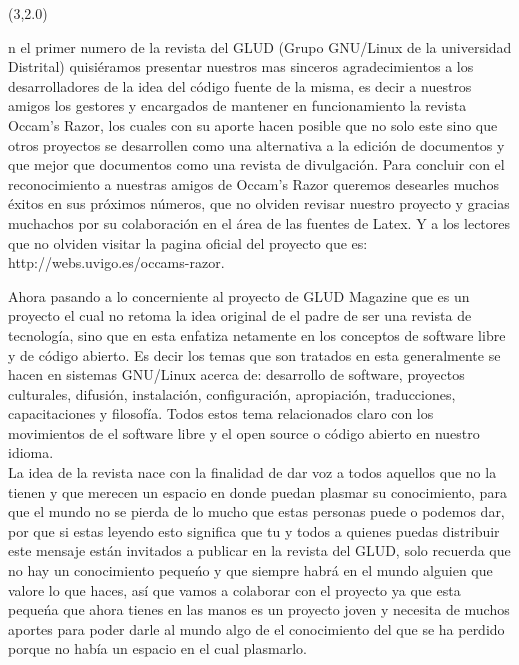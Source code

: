 \begin{textblock}{20}(3,2.0)

\begin{minipage}{.45\linewidth}
\colorbox{introcolor}{
\begin{minipage}{1\linewidth}

{{}{n el primer numero de la revista del GLUD (Grupo GNU/Linux de la universidad Distrital) 
quisiéramos presentar nuestros mas sinceros agradecimientos a los desarrolladores de la 
idea del código fuente de la misma, es decir a nuestros amigos los gestores y encargados 
de mantener en funcionamiento la revista Occam's Razor, los cuales con su aporte hacen 
posible que no solo este sino que otros proyectos se desarrollen como una alternativa a 
la edición de documentos y que mejor que documentos como una revista de divulgación. Para 
concluir con el reconocimiento a nuestras amigos de Occam's Razor queremos desearles 
muchos éxitos en sus próximos números, que no olviden revisar nuestro proyecto y gracias 
muchachos por su colaboración en el área de las fuentes de Latex. Y a los lectores que no 
olviden visitar la pagina oficial del proyecto que es: http://webs.uvigo.es/occams-razor.





\bigskip

}
}

\end{minipage}
}

\vspace{6mm}

Ahora pasando a lo concerniente al proyecto de GLUD Magazine que es un proyecto el cual no 
retoma la idea original de el padre de ser una revista de tecnología, sino que en esta 
enfatiza netamente en los conceptos de software  libre y de código abierto. Es decir los 
temas que son tratados en esta generalmente se hacen en sistemas GNU/Linux acerca de: desarrollo 
de software, proyectos culturales, difusión, instalación, configuración, apropiación, traducciones, 
capacitaciones y filosofía. Todos estos tema relacionados claro con los movimientos  de el software 
libre y el open source o código abierto en nuestro idioma.\\ 

La idea de la revista nace con la finalidad de dar voz a todos aquellos que no la tienen y que merecen
un espacio en donde puedan plasmar su conocimiento, para que el mundo no se pierda de lo mucho
que estas personas puede o podemos dar, por que si estas leyendo esto significa que tu y todos a
quienes puedas distribuir este mensaje están invitados a publicar en la revista del GLUD, solo recuerda
que no hay un conocimiento pequeńo y que siempre habrá en el mundo alguien que valore lo que
haces, así que vamos a colaborar con el proyecto ya que esta pequeńa que ahora tienes en las manos es
un  proyecto joven y necesita de muchos aportes para poder darle al mundo algo de el conocimiento
del que se ha perdido porque no había un espacio en el cual plasmarlo.\\


\end{minipage}
\end{textblock}
